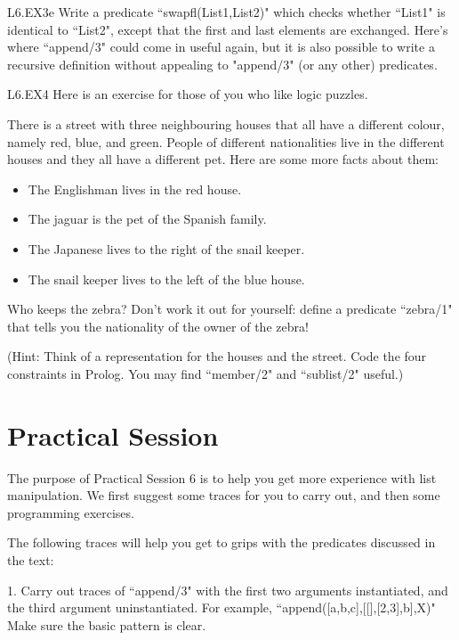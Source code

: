 \begin{LPNexercise}{L6.EX3e}
Write a predicate ``swapfl(List1,List2)" which checks whether ``List1"
is identical to ``List2", except that the first and last elements are
exchanged.  Here's where ``append/3" could come in useful again, but it
is also possible to write a recursive definition without appealing to
"append/3" (or any other) predicates.
\end{LPNexercise}





\begin{LPNexercise}{L6.EX4}
Here is an exercise for those of you who like logic
puzzles.

There is a street with three neighbouring houses that all have a
different colour, namely red, blue, and green. People of different
nationalities live in the different houses and they all have a
different pet. Here are some more facts about them:
\begin{itemize}
\item{}The Englishman lives in the red house.
\item{}The jaguar is the pet of the Spanish family.
\item{}The Japanese lives to the right of the snail keeper.
\item{}The snail keeper lives to the left of the blue house.
\end{itemize}
Who keeps the zebra? Don't work it out for yourself:
define a predicate ``zebra/1" that tells you the nationality
of the owner of the zebra!

(Hint: Think of a representation for the houses and the street. Code the
four constraints in Prolog. You may find ``member/2" and ``sublist/2"
useful.)
\end{LPNexercise}


\section{Practical Session}\label{SEC.L6.PRAXIS}



The purpose of Practical Session 6 is to help you get more experience
with list manipulation.  We first suggest some traces for you to carry
out, and then some programming exercises.

The following traces will help you get to grips with the
predicates  discussed in the text:

1. Carry out traces of ``append/3" with the
first two arguments instantiated, and the third argument
uninstantiated. For example, ``append([a,b,c],[[],[2,3],b],X)"
Make sure the basic pattern is clear.

